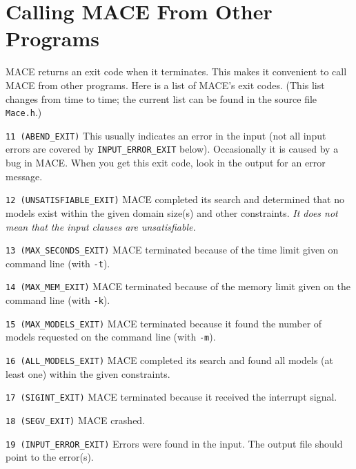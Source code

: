 \documentclass[11pt]{article}
\begin{document}
\section{Calling MACE From Other Programs}

MACE returns an exit code when it terminates.
This makes it convenient to call MACE from other programs.
Here is a list of MACE's exit codes.
(This list changes from time to time; the current
list can be found in the source file \texttt{Mace.h}.)
\begin{description}
\item{\texttt{11 (ABEND\_EXIT)}}
This usually indicates an error in the
input (not all input errors are covered by
\texttt{INPUT\_ERROR\_EXIT} below).
Occasionally it is caused by a bug in MACE.
When you get this exit code, look in the output for an error message.
\item{\texttt{12 (UNSATISFIABLE\_EXIT)}}
MACE completed its search and determined that
no models exist within the given domain size(s) and other constraints.
\emph{It does not mean that the input clauses are unsatisfiable.}
\item{\texttt{13 (MAX\_SECONDS\_EXIT)}}
MACE terminated because of the time limit given on
command line (with \texttt{-t}).
\item{\texttt{14 (MAX\_MEM\_EXIT)}}
MACE terminated because of the memory limit given
on the command line (with \texttt{-k}).
\item{\texttt{15 (MAX\_MODELS\_EXIT)}}
MACE terminated because it found the number of
models requested on the command line (with \texttt{-m}).
\item{\texttt{16 (ALL\_MODELS\_EXIT)}}
MACE completed its search and found all models
(at least one) within the given constraints.
\item{\texttt{17 (SIGINT\_EXIT)}}
MACE terminated because it received the interrupt signal.
\item{\texttt{18 (SEGV\_EXIT)}}
MACE crashed.
\item{\texttt{19 (INPUT\_ERROR\_EXIT)}}
Errors were found in the input.
The output file should point to the error(s).
\end{description}
\end{document}
